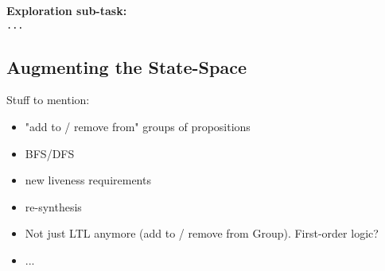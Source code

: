 \begin{algorithm}
	\textbf{Exploration sub-task:}\\
	{\small
	\texttt{...}
	}
\end{algorithm}

\subsection{Augmenting the State-Space} %

Stuff to mention:
\begin{itemize}
	\item "add to / remove from" groups of propositions
	\item BFS/DFS
	\item new liveness requirements
	\item re-synthesis
	\item Not just LTL anymore (add to / remove from Group). First-order logic?
	\item ...
\end{itemize}

